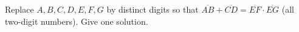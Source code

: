 Replace $A,B,C,D,E,F,G$ by distinct digits so that $\overline{AB}+\overline{CD}=\overline{EF}\cdot\overline{EG}$ (all two-digit numbers). Give one solution.
